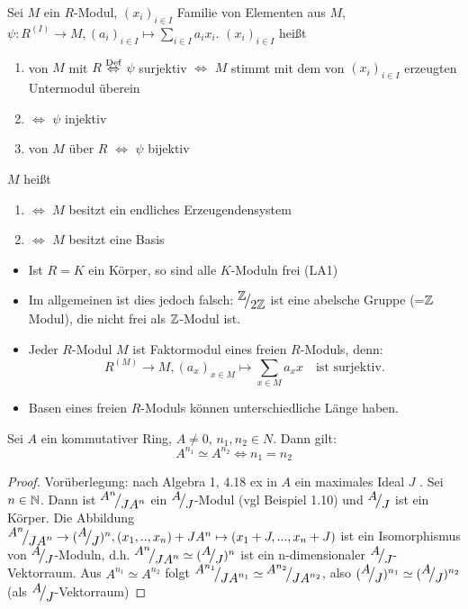 \begin{df}\label{df1.21}
	Sei $M$ ein $R$-Modul, $(x_i)_{i \in I} $ Familie von Elementen aus $M$, $\psi:R^{(I)} \to M, (a_i)_{i \in I} \mapsto \sum_{i\in I}a_ix_i$.
	$(x_i)_{i \in I} $ heißt 
	\begin{enumerate}
		\item[]  von $M$ mit $R$ $\overset{\text{Def}}{\Leftrightarrow}$  $\psi $ surjektiv $\Longleftrightarrow$ $M$ stimmt mit dem von $(x_i)_{i \in I} $ erzeugten Untermodul überein
		\item[]	 $\Longleftrightarrow$ $\psi $ injektiv 
		\item[]  von $M$ über $R$ $\Longleftrightarrow$ $\psi$ bijektiv 
	\end{enumerate}
	$M$ heißt
	\begin{enumerate}
		\item[]	  $\Longleftrightarrow$ $M$ besitzt ein endliches Erzeugendensystem 
		\item[]  $\Longleftrightarrow$ $M$ besitzt eine Basis
	\end{enumerate}
\end{df}
\begin{anm}
	\begin{itemize}
		\item Ist $R=K$ ein Körper, so sind alle $K$-Moduln frei (LA1)
		\item Im allgemeinen ist dies jedoch falsch: $\QR{\Z}{2\Z} $ ist eine abelsche Gruppe (=$\mathbb{Z}$ Modul), die nicht frei als $\mathbb{Z}$-Modul ist.
		\item Jeder $R$-Modul $M$ ist Faktormodul eines freien $R$-Moduls, denn: $$ R^{(M)} \to M, (a_x)_{ x \in M} \mapsto \sum_{x\in M}a_{x}x \quad \text{ist surjektiv}.$$
		\item Basen eines freien $R$-Moduls können unterschiedliche Länge haben.
	\end{itemize}
\end{anm}
\begin{sa}\label{sa1.22}
	Sei $A$ ein kommutativer Ring, $A \neq 0$, $n_1,n_2 \in N $. Dann gilt: \\
	$$ A^{n_1} \simeq A^{n_2} \Longleftrightarrow n_1 =n_2 $$
\end{sa}
\begin{proof}
	Vorüberlegung: nach Algebra 1, 4.18 ex in $A$ ein maximales Ideal $J$ . Sei $n \in \mathbb{N}$. Dann ist $\QR{A^{n}}{JA^{n}}$ ein $\QR{A}{J}$-Modul (vgl Beispiel 1.10) und $\QR{A}{J}$ ist ein Körper. Die Abbildung $\QR{A^{n}}{JA^{n}} \to (\QR{A}{J})^{n}, (x_1,..,x_n) +JA^{n} \mapsto (x_1+J,...,x_n+J) $ ist ein Isomorphismus von $\QR{A}{J}$-Moduln, d.h. $\QR{A^{n}}{JA^{n}} \simeq (\QR{A}{J})^{n} $ ist ein n-dimensionaler $\QR{A}{J}$-Vektorraum. Aus $ A^{n_1} \simeq A^{n_2}$ folgt $\QR{A^{n_1}}{JA^{n_1}} \simeq \QR{A^{n_2}}{JA^{n_2}}$, also $ (\QR{A}{J})^{n_1} \simeq (\QR{A}{J})^{n_2}$ (als $\QR{A}{J}$-Vektorraum)
\end{proof}

